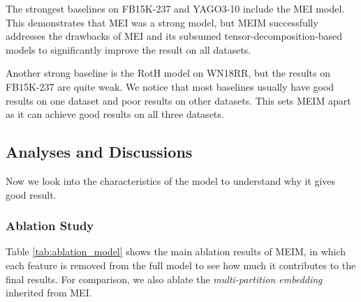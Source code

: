 \documentclass{article}
\theoremstyle{plain}
\theoremstyle{remark}
\begin{document}
The strongest baselines on FB15K-237 and YAGO3-10 include the MEI model. This demonstrates that MEI was a strong model, but MEIM successfully addresses the drawbacks of MEI and its subsumed tensor-decomposition-based models to significantly improve the result on all datasets. 

Another strong baseline is the RotH model on WN18RR, but the results on FB15K-237 are quite weak. We notice that most baselines usually have good results on one dataset and poor results on other datasets. This sets MEIM apart as it can achieve good results on all three datasets. 

\subsection{Analyses and Discussions}
Now we look into the characteristics of the model to understand why it gives good result.

\subsubsection{Ablation Study}
Table \ref{tab:ablation_model} shows the main ablation results of MEIM, in which each feature is removed from the full model to see how much it contributes to the final results. For comparison, we also ablate the \textit{multi-partition embedding} inherited from MEI. 
\end{document}
